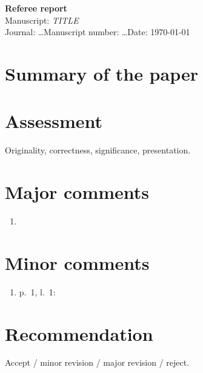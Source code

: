 \documentclass[11pt]{article}
\begin{document}
\begin{center}
{\large\bfseries Referee report}\\[4pt]
Manuscript: \emph{{{TITLE}}}\\
Journal: \dots \quad Manuscript number: \dots \quad Date: \today
\end{center}
\section*{Summary of the paper}
\section*{Assessment}
Originality, correctness, significance, presentation.
\section*{Major comments}
\begin{enumerate}
  \item
\end{enumerate}
\section*{Minor comments}
\begin{enumerate}
  \item p.~1, l.~1:
\end{enumerate}
\section*{Recommendation}
Accept / minor revision / major revision / reject.
\end{document}
